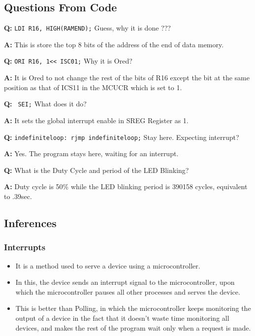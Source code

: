 \documentclass[titlepage, 11pt]{article}
\newenvironment{qanda}{\setlength{\parindent}{0pt}}{\bigskip}
\newcommand{\Q}{\bigskip\textbf{Q:} }
\newcommand{\A}{\par\textbf{A:} \normalfont}
\begin{document}
{\renewcommand\fcolorbox[4][]{\textcolor{black}{\strut#4}}
\inputminted[breaklines,
 mathescape,
 linenos,
 numbersep=5pt,
 frame=single,
 numbersep=5pt,
 xleftmargin=0pt]{asm}{"Prob2.asm"}}


\subsection{Questions From Code}
\begin{qanda}

\Q \texttt{LDI R16, HIGH(RAMEND);} Guess, why it is done ???
\A This is store the top 8 bits of the address of the end of data memory.

\Q {\renewcommand\fcolorbox[4][]{\textcolor{black}{\strut#4}}\texttt{ORI R16, 1<< ISC01;}} Why it is Ored?
\A It is Ored to not change the rest of the bits of R16 except the bit at the same position as that of ICS11 in the MCUCR which is set to 1. 

\Q\texttt{ SEI;} What does it do?
\A It sets the global interrupt enable in SREG Register as 1.

\Q \texttt{indefiniteloop: rjmp indefiniteloop;} Stay here. Expecting interrupt? 
\A Yes. The program stays here, waiting for an interrupt.

\Q What is the Duty Cycle and period of the LED Blinking?
\A Duty cycle is 50\%  while the LED blinking period is 390158 cycles, equivalent to  .39sec.

\end{qanda}

\subsection{Inferences}

\subsubsection{Interrupts}
\begin{itemize}
    \item It is a method used to serve a device using a microcontroller.
    \item In this, the device sends an interrupt signal to the microcontroller, upon which the microcontroller pauses all other processes and serves the device.
    \item This is better than Polling, in which the microcontroller keeps monitoring the output of a device in the fact that it doesn't waste time monitoring all devices, and makes the rest of the program wait only when a request is made.
\end{itemize}
\end{document}
